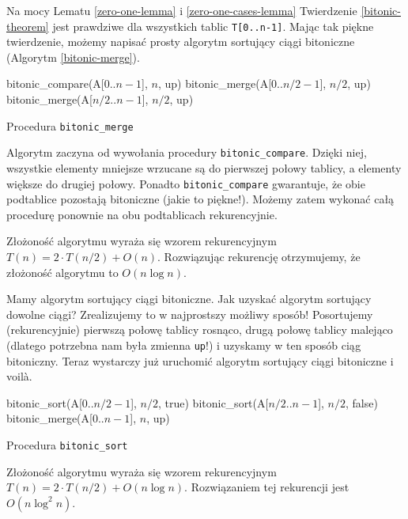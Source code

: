 Na mocy Lematu \ref{zero-one-lemma} i \ref{zero-one-cases-lemma} Twierdzenie \ref{bitonic-theorem} jest prawdziwe dla wszystkich tablic \texttt{T[0..n-1]}.
Mając tak piękne twierdzenie, możemy napisać prosty algorytm sortujący ciągi bitoniczne (Algorytm \ref{bitonic-merge}).

\begin{algorithm}[h]
  \DontPrintSemicolon
  
  
  
   {
     bitonic\_compare(A[$0$..$n-1$], $n$,   up)\;
     bitonic\_merge(A[$0$..$n/2-1$], $n/2$, up)\;
     bitonic\_merge(A[$n/2$..$n-1$], $n/2$, up)\;
   }
  \caption{Procedura \texttt{bitonic\_merge}}
  \label{bitonic-merge}
\end{algorithm}

Algorytm zaczyna od wywołania procedury \texttt{bitonic\_compare}.
Dzięki niej, wszystkie elementy mniejsze wrzucane są do pierwszej połowy tablicy, a elementy większe do drugiej połowy.
Ponadto \texttt{bitonic\_compare} gwarantuje, że obie podtablice pozostają bitoniczne (jakie to piękne!).
Możemy zatem wykonać całą procedurę ponownie na obu podtablicach rekurencyjnie.

Złożoność algorytmu wyraża się wzorem rekurencyjnym $T(n) = 2 \cdot T(n/2) + O(n)$.
Rozwiązując rekurencję otrzymujemy, że złożoność algorytmu to $O(n \log n)$.

Mamy algorytm sortujący ciągi bitoniczne.
Jak uzyskać algorytm sortujący dowolne ciągi?
Zrealizujemy to w najprostszy możliwy sposób!
Posortujemy (rekurencyjnie) pierwszą połowę tablicy rosnąco, drugą połowę tablicy malejąco (dlatego potrzebna nam była zmienna \texttt{up}!) i uzyskamy w ten sposób ciąg bitoniczny.
Teraz wystarczy już uruchomić algorytm sortujący ciągi bitoniczne i voilà.

\begin{algorithm}[h]
  \DontPrintSemicolon
  
  
  
   {
     bitonic\_sort(A[$0$..$n/2-1$], $n/2$, true)\;
     bitonic\_sort(A[$n/2$..$n-1$], $n/2$, false)\;
     bitonic\_merge(A[$0$..$n-1$], $n$, up)\;
   }
  \caption{Procedura \texttt{bitonic\_sort}}
  \label{bitonic-sort}
\end{algorithm}

Złożoność algorytmu wyraża się wzorem rekurencyjnym $T(n) = 2 \cdot T(n/2) + O(n \log n)$.
Rozwiązaniem tej rekurencji jest $O(n \log^2 n)$.